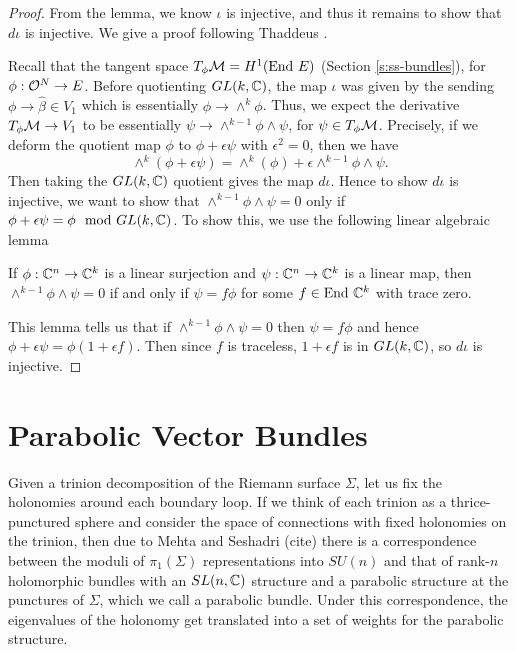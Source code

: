 	\begin{proof}
		From the lemma, we know $\iota$ is injective, and thus it remains to show that $d\iota$ is injective. We give a proof following Thaddeus \cite[Prop 7.1]{thaddeus_geometric_1996}.
		
		Recall that the tangent space $T_\phi \mathcal{M} = H^1(\text{End } E)$ (Section \ref{s:ss-bundles}), for $\phi:\mathcal{O}^N \to E$. Before quotienting $GL(k,\mathbb{C})$, the map $\iota$ was given by the sending $\phi \to \hat{\beta} \in V_1$ which is essentially $\phi \to \wedge^k \phi$. Thus, we expect the derivative $T_\phi\mathcal{M}\to V_1$ to be essentially $\psi \to \wedge^{k-1}\phi \wedge \psi$, for $\psi \in T_\phi \mathcal{M}$. Precisely, if we deform the quotient map $\phi$ to $\phi + \epsilon\psi$ with $\epsilon^2 = 0$, then we have
		\begin{equation}
			\wedge^k (\phi+ \epsilon\psi) = \wedge^k(\phi) + \epsilon\wedge^{k-1}\phi\wedge \psi.
		\end{equation}
		Then taking the $GL(k,\mathbb{C})$ quotient gives the map $d\iota$. Hence to show $d\iota$ is injective, we want to show that $\wedge^{k-1}\phi \wedge \psi =0$ only if $\phi+\epsilon \psi = \phi \mod GL(k,\mathbb{C})$. To show this, we use the following linear algebraic lemma \cite[Lemma 7.2]{thaddeus_geometric_1996}
		\begin{lemma}
			If $\phi:\mathbb{C}^n \to \mathbb{C}^k$ is a linear surjection and $\psi:\mathbb{C}^n\to\mathbb{C}^k$ is a linear map, then $\wedge^{k-1}\phi\wedge\psi =0$ if and only if $\psi = f\phi$ for some $f\in \text{End } \mathbb{C}^k$ with trace zero.
		\end{lemma}
		This lemma tells us that if $\wedge^{k-1}\phi\wedge\psi=0$ then $\psi = f\phi$ and hence $\phi+\epsilon\psi = \phi(1 + \epsilon f)$. Then since $f$ is traceless, $1+\epsilon f$ is in $GL(k,\mathbb{C})$, so $d\iota$ is injective.
	\end{proof}

	\section{Parabolic Vector Bundles}
	Given a trinion decomposition of the Riemann surface $\Sigma$, let us fix the holonomies around each boundary loop. If we think of each trinion as a thrice-punctured sphere and consider the space of connections with fixed holonomies on the trinion, then due to Mehta and Seshadri (cite) there is a correspondence between the moduli of $\pi_1(\Sigma)$ representations into $SU(n)$ and that of rank-$n$ holomorphic bundles with an $SL(n,\mathbb{C})$ structure and a parabolic structure at the punctures of $\Sigma$, which we call a parabolic bundle. Under this correspondence, the eigenvalues of the holonomy get translated into a set of weights for the parabolic structure. 
	
